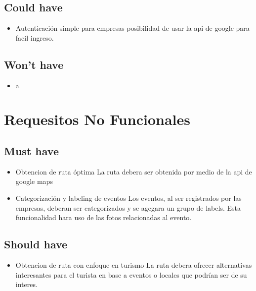 \documentclass[a4paper,12pt,oneside]{article}
\begin{document}
\subsection{Could have}
  \begin{itemize}
    \item Autenticación simple para empresas
      posibilidad de usar la api de google para facil ingreso.
  \end{itemize}

\subsection{Won't have}
  \begin{itemize}
    \item a
  \end{itemize}

\section{Requesitos No Funcionales}

\subsection{Must have}
  \begin{itemize}
    \item Obtencion de ruta óptima
      La ruta debera ser obtenida por medio de la api de google maps
    \item Categorización y labeling de eventos
      Los eventos, al ser registrados por las empresas, deberan ser categorizados y se agegara un grupo de labels. Esta funcionalidad hara uso de las fotos relacionadas al evento.
  \end{itemize}

\subsection{Should have}
  \begin{itemize}
    \item Obtencion de ruta con enfoque en turismo
      La ruta debera ofrecer alternativas interesantes para el turista en base a eventos o locales que podrían ser de su interes.
  \end{itemize}

\printbibliography[title={Bibliography}]
\end{document}
